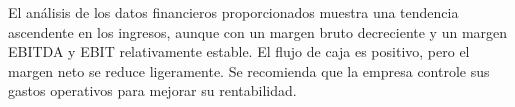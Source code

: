 

El análisis de los datos financieros proporcionados muestra una tendencia ascendente en los ingresos, aunque con un margen bruto decreciente y un margen EBITDA y EBIT relativamente estable. El flujo de caja es positivo, pero el margen neto se reduce ligeramente. Se recomienda que la empresa controle sus gastos operativos para mejorar su rentabilidad.